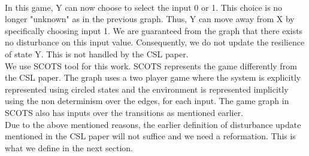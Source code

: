 \begin{itemize}
\\
In this game, Y can now choose to select the input 0 or 1. This choice is no longer "unknown" as in the previous graph. Thus, Y can move away from X by specifically choosing input 1. We are guaranteed from the graph that there exists no disturbance on this input value. Consequently, we do not update the resilience of state Y. This is not handled by the CSL paper. \\
We use SCOTS tool for this work. SCOTS represents the game differently from the CSL paper. The graph uses a two player game where the system is explicitly represented using circled states and the environment is represented implicitly using the non determinism over the edges, for each input. The game graph in SCOTS also has inputs over the transitions as mentioned earlier. \\
Due to the above mentioned reasons, the earlier definition of disturbance update mentioned in the CSL paper will not suffice and we need a reformation. This is what we define in the next section. \\


\end{itemize}
